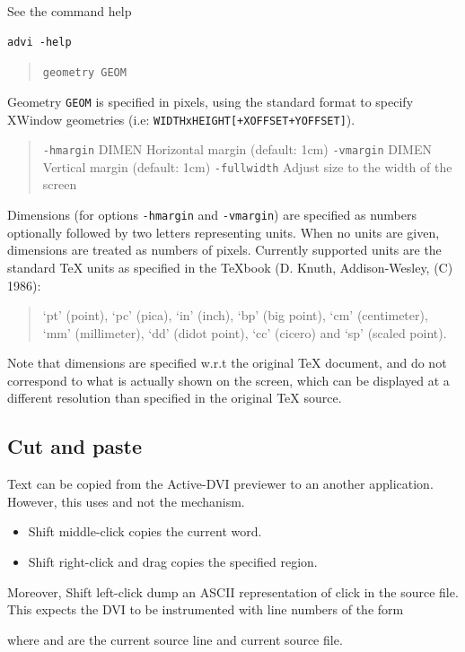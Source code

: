 \documentclass[12pt]{article}
\def \ActiveDVI {Active-DVI}
\begin{document}
See the command help
\begin{verbatim}
advi -help
\end{verbatim}

\begin{quote}
\verb"geometry GEOM"
\end{quote}

Geometry \verb"GEOM" is specified in pixels, using the standard format
to specify XWindow geometries (i.e: \verb"WIDTHxHEIGHT[+XOFFSET+YOFFSET]").

\begin{quote}
\verb"-hmargin" DIMEN        Horizontal margin  (default: 1cm)
\verb"-vmargin" DIMEN        Vertical margin    (default: 1cm)
\verb"-fullwidth"             Adjust size to the width of the screen
\end{quote}

Dimensions (for options \verb"-hmargin" and \verb"-vmargin") are specified as
numbers optionally followed by two letters representing units.
When no units are given, dimensions are treated as numbers of pixels.
Currently supported units are the standard TeX units as specified in
the TeXbook (D. Knuth, Addison-Wesley, (C) 1986):
\begin{quote}
 `pt' (point), `pc' (pica), `in' (inch), `bp' (big point),
 `cm' (centimeter), `mm' (millimeter), `dd' (didot point),
 `cc' (cicero) and `sp' (scaled point).
\end{quote}
Note that dimensions are specified w.r.t the original TeX document,
and do not correspond to what is actually shown on the screen, which
can be displayed at a different resolution than specified in the
original TeX source.

\subsection {Cut and paste}

Text can be copied from the {\ActiveDVI} previewer to an another application.
However, this uses  and not the 
mechanism.
\begin {itemize}
\item
Shift middle-click copies the current word. 
\item
Shift right-click and drag copies the specified region. 
\end {itemize}
Moreover, Shift left-click dump an ASCII representation of click 
in the source file. This expects the DVI to be instrumented with line
numbers of the form
\begin{quote}
  
\end{quote}
where  and  are the current source line and
current source file.
\end{document}
